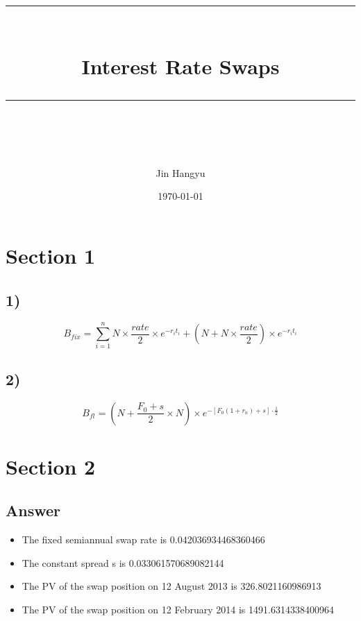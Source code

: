 \documentclass[a4paper, 11pt]{article}
\title{	
\normalfont \normalsize
\rule{\textwidth}{0.5pt} \\[0.4cm] %
\huge  Interest Rate Swaps\\ %
\rule{\textwidth}{2pt} \\[0.5cm] %
\author{Jin Hangyu}
\date{\normalsize\today}
}
\begin{document}
\maketitle
\section{Section 1}
\subsection{1)}
$$B_{fix}=\sum_{i=1}^{n}N\times \frac{rate}{2}\times e^{-r_it_i}+(N+N\times \frac{rate}{2})\times e^{-r_it_i}$$
\subsection{2)}
$$B_{fl}=(N+\frac{F_0+s}{2}\times N)\times e^{-[F_0(1+r_n)+s]\cdot \frac{1}{2}}$$
\section{Section 2}
\subsection{Answer}
\begin{itemize}
\item The fixed semiannual swap rate is 0.042036934468360466

\item The constant spread s is 0.033061570689082144

\item The PV of the swap position on 12 August 2013 is 326.8021160986913

\item The PV of the swap position on 12 February 2014 is 1491.6314338400964
\end{itemize}
\end{document}
